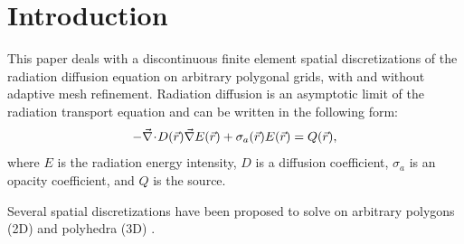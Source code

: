 \section{Introduction} \label{sec_intro}

This paper deals with a discontinuous finite element spatial discretizations of the radiation 
diffusion equation on arbitrary polygonal grids, with and without adaptive mesh refinement. 
Radiation diffusion is an asymptotic limit of the radiation transport equation and can be 
written in the following form:
\begin{equation} \label{eq:radiation_diffusion}
- \vec{\nabla}\! \cdot \!  D(\vec{r}) \vec{\nabla} E(\vec{r}) + \sigma_a(\vec{r}) E(\vec{r}) = Q(\vec{r}) ,
\end{equation}
where $E$ is the radiation energy intensity, $D$ is a diffusion coefficient, $\sigma_a$ is 
an opacity coefficient, and $Q$ is the source.

Several spatial discretizations have been proposed to solve  on
arbitrary polygons (2D) and polyhedra (3D) \cite{Wachspress,MorelDendyHallWhite1992,
PalmerLLNL,Palmer2005,MorelHallShashkov,BaileyAdams2008,KutnetsovMimetic}. 

